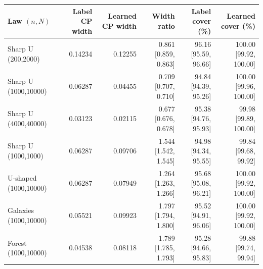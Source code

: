 \begin{tabular}{lrrrrr}
\toprule
Law $(n,N)$ & Label CP width & Learned CP width & Width ratio & Label cover (\%) & Learned cover (\%)\\
\midrule
Sharp U (200,2000) & 0.14234 & 0.12255 & 0.861 [0.859, 0.863] & 96.16 [95.59, 96.66] & 100.00 [99.92, 100.00]\\
Sharp U (1000,10000) & 0.06287 & 0.04455 & 0.709 [0.707, 0.710] & 94.84 [94.39, 95.26] & 100.00 [99.96, 100.00]\\
Sharp U (4000,40000) & 0.03123 & 0.02115 & 0.677 [0.676, 0.678] & 95.38 [94.76, 95.93] & 99.98 [99.89, 100.00]\\
Sharp U (1000,1000) & 0.06287 & 0.09706 & 1.544 [1.542, 1.545] & 94.98 [94.34, 95.55] & 99.84 [99.68, 99.92]\\
U-shaped (1000,10000) & 0.06287 & 0.07949 & 1.264 [1.263, 1.266] & 95.68 [95.08, 96.21] & 100.00 [99.92, 100.00]\\
Galaxies (1000,10000) & 0.05521 & 0.09923 & 1.797 [1.794, 1.800] & 95.52 [94.91, 96.06] & 100.00 [99.92, 100.00]\\
Forest (1000,10000) & 0.04538 & 0.08118 & 1.789 [1.785, 1.793] & 95.28 [94.66, 95.83] & 99.88 [99.74, 99.94]\\
\bottomrule
\end{tabular}